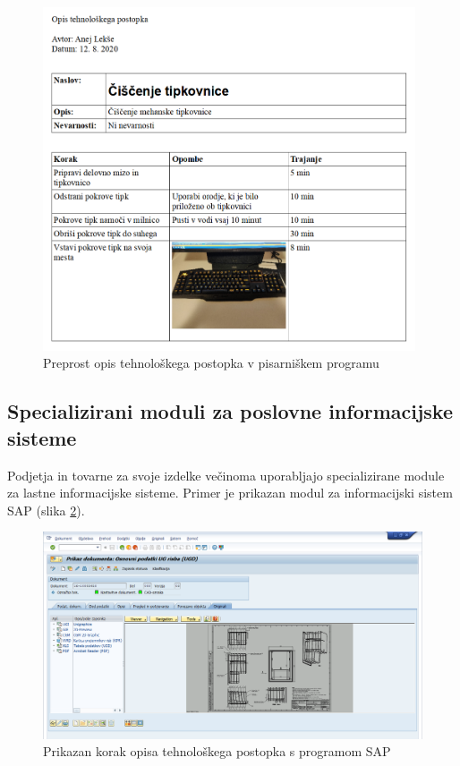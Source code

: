 \documentclass[a4paper, 12pt]{book}
\begin{document}
\begin{figure}[H]
\begin{center}
\includegraphics[width=11cm]{report_writer}
\end{center}
\caption{Preprost opis tehnološkega postopka v pisarniškem programu}
\label{report_writer}
\end{figure}

\subsection{Specializirani moduli za poslovne informacijske sisteme}

	Podjetja in tovarne za svoje izdelke večinoma uporabljajo specializirane module za lastne informacijske sisteme.
	Primer je prikazan modul za informacijski sistem SAP (slika \ref{sap_1}).

	\begin{figure}[H]
	\begin{center}
	\includegraphics[width=13cm]{sap_1}
	\end{center}
	\caption{Prikazan korak opisa tehnološkega postopka s programom SAP}
	\label{sap_1}
	\end{figure}
\end{document}

